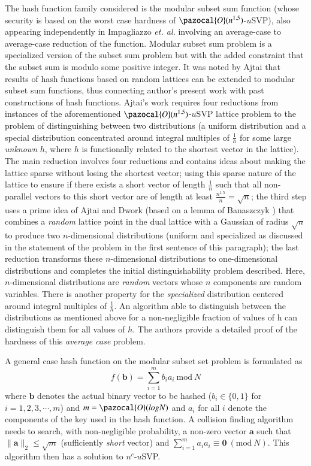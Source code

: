 \documentclass[10pt]{elsarticle}
\begin{document}
The hash function family considered is the modular subset sum
function (whose security is based on the worst case hardness of
$\pazocal{O}(n^{1.5})$-$u$SVP), also appearing independently in
Impagliazzo \textit{et. al.}\cite{CRHF_Impagliazzo1996} involving an
average-case to average-case reduction of the function. Modular
subset sum problem is a specialized version of the subset sum
problem but with the added constraint that the subset sum is modulo
some positive integer. It was noted by Ajtai\cite{CRHF_Ajtai1996}
that results of hash functions based on random lattices can be
extended to modular subset sum functions, thus connecting author's
present work with past constructions of hash functions. Ajtai's work
\cite{CRHF_Ajtai1996} requires four reductions from instances of the
aforementioned $\pazocal{O}(n^{1.5})$-$u$SVP lattice problem to the
problem of distinguishing between two distributions (a uniform
distribution and a special distribution concentrated around integral
multiples of $\frac{1}{h}$ for some large \textit{unknown} $h$,
where $h$ is functionally related to the shortest vector in the
lattice). The main reduction involves four reductions and contains
ideas about making the lattice sparse without losing the shortest
vector; using this sparse nature of the lattice to ensure if there
exists a short vector of length $\frac{1}{n}$ such that all
non-parallel vectors to this short vector are of length at least
$\frac{n^{1.5}}{n}=\sqrt{n}$; the third step uses a prime idea of
Ajtai and Dwork \cite{CRHF_Ajtai1997} (based on a lemma of
Banaszczyk \cite{CRHF_Banaszczyk1993}) that combines a
\textit{random} lattice point in the dual lattice with a Gaussian of
radius $\sqrt{n}$ to produce two $n$-dimensional distributions
(uniform and specialized as discussed in the statement of the
problem in the first sentence of this paragraph); the last reduction
transforms these $n$-dimensional distributions to one-dimensional
distributions and completes the initial distinguishability problem
described. Here, $n$-dimensional distributions are \textit{random}
vectors whose $n$ components are random variables. There is another
property for the \textit{specialized} distribution centered around
integral multiples of $\frac{1}{h}$. An algorithm able to
distinguish between the distributions as mentioned above for a
non-negligible fraction of values of h can distinguish them for all
values of $h$. The authors provide a detailed proof of the hardness
of this \textit{average case} problem.

A general case hash function on the modular subset set problem is
formulated as $$f(\mathbf{b}) = \sum^{m}_{i =
1}b_{i}a_{i}~\mbox{mod}~N$$ where $\mathbf{b}$ denotes the actual
binary vector to be hashed ($b_{i} \in \{0, 1\}$ for $i = 1, 2, 3,
\cdots, m$) and $m = \pazocal{O} (log N)$ and $a_{i}$ for all $i$
denote the components of the key used in the hash function. A
collision finding algorithm needs to search, with non-negligible
probability, a non-zero vector $\mathbf{a}$ such that $\parallel
\mathbf{a} \parallel_{2} \leq \sqrt{m}$ (sufficiently \textit{short}
vector) and $\sum^{m}_{i =
1}a_{i}a_{i}\equiv\mathbf{0}~(\mbox{mod}~N)$. This algorithm then
has a solution to $n^{c}$-$u$SVP.
\end{document}

